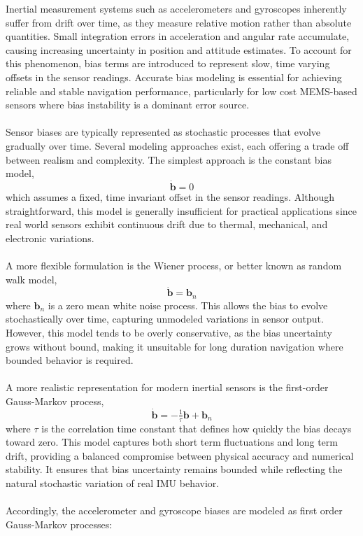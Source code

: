 Inertial measurement systems such as accelerometers and gyroscopes inherently suffer from drift over time, as they measure relative motion rather than absolute quantities. Small integration errors in acceleration and angular rate accumulate, causing increasing uncertainty in position and attitude estimates. To account for this phenomenon, bias terms are introduced to represent slow, time varying offsets in the sensor readings. Accurate bias modeling is essential for achieving reliable and stable navigation performance, particularly for low cost MEMS-based sensors where bias instability is a dominant error source.  
\\ \\
Sensor biases are typically represented as stochastic processes that evolve gradually over time. Several modeling approaches exist, each offering a trade off between realism and complexity. The simplest approach is the constant bias model,
$$
    \dot{\mathbf{b}} = 0
$$
which assumes a fixed, time invariant offset in the sensor readings. Although straightforward, this model is generally insufficient for practical applications since real world sensors exhibit continuous drift due to thermal, mechanical, and electronic variations.  
\\ \\
A more flexible formulation is the Wiener process, or better known as random walk model,
$$
    \dot{\mathbf{b}} = \mathbf{b}_n
$$
where $\mathbf{b}_n$ is a zero mean white noise process. This allows the bias to evolve stochastically over time, capturing unmodeled variations in sensor output. However, this model tends to be overly conservative, as the bias uncertainty grows without bound, making it unsuitable for long duration navigation where bounded behavior is required.  
\\ \\
A more realistic representation for modern inertial sensors is the first-order Gauss-Markov process,
$$
    \dot{\mathbf{b}} = -\tfrac{1}{\tau}\mathbf{b} + \mathbf{b}_n
$$
where $\tau$ is the correlation time constant that defines how quickly the bias decays toward zero. This model captures both short term fluctuations and long term drift, providing a balanced compromise between physical accuracy and numerical stability. It ensures that bias uncertainty remains bounded while reflecting the natural stochastic variation of real IMU behavior.  
\\ \\
Accordingly, the accelerometer and gyroscope biases are modeled as first order Gauss-Markov processes:
